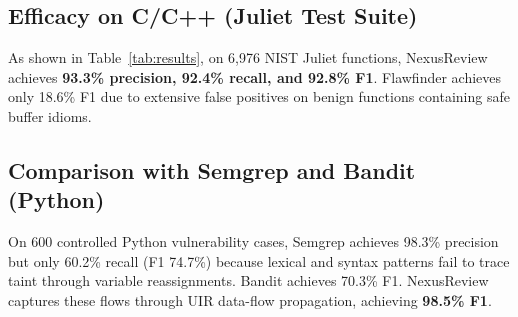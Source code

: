 \documentclass[10pt,conference]{IEEEtran}
\begin{document}
\begin{table}[t]
\centering
\caption{NexusReview comparative evaluation summary (case level).}
\label{tab:results}
\end{table}

\subsection{Efficacy on C/C++ (Juliet Test Suite)}
As shown in Table~\ref{tab:results}, on 6{,}976 NIST Juliet functions, NexusReview achieves \textbf{93.3\% precision, 92.4\% recall, and 92.8\% F1}. Flawfinder achieves only 18.6\% F1 due to extensive false positives on benign functions containing safe buffer idioms.

\subsection{Comparison with Semgrep and Bandit (Python)}
On 600 controlled Python vulnerability cases, Semgrep achieves 98.3\% precision but only 60.2\% recall (F1 74.7\%) because lexical and syntax patterns fail to trace taint through variable reassignments. Bandit achieves 70.3\% F1. NexusReview captures these flows through UIR data-flow propagation, achieving \textbf{98.5\% F1}.
\end{document}
